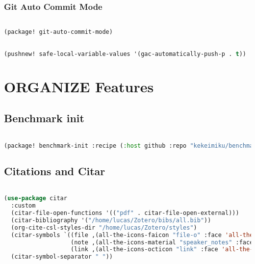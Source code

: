 \documentclass[11pt]{article}
\begin{document}
\subsubsection{Git Auto Commit Mode}
\label{sec:git-auto-commit-mode}
\begin{lstlisting}[language=Lisp]%! Someone please complete this list for me

(package! git-auto-commit-mode)
\end{lstlisting}

\begin{lstlisting}[language=Lisp]%! Someone please complete this list for me

(pushnew! safe-local-variable-values '(gac-automatically-push-p . t))
\end{lstlisting}



\section{ORGANIZE Features}
\label{sec:organize-features}


\subsection{Benchmark init}
\label{sec:benchmark-init}
\begin{lstlisting}[language=Lisp]%! Someone please complete this list for me

(package! benchmark-init :recipe (:host github :repo "kekeimiku/benchmark-init-el"))
\end{lstlisting}

\subsection{Citations and Citar}
\label{sec:citations-and-citar}
\begin{lstlisting}[language=Lisp]%! Someone please complete this list for me

(use-package citar
  :custom
  (citar-file-open-functions '(("pdf" . citar-file-open-external)))
  (citar-bibliography '("/home/lucas/Zotero/bibs/all.bib"))
  (org-cite-csl-styles-dir "/home/lucas/Zotero/styles")
  (citar-symbols `((file ,(all-the-icons-faicon "file-o" :face 'all-the-icons-green :v-adjust -0.1) . " ")
                   (note ,(all-the-icons-material "speaker_notes" :face 'all-the-icons-blue :v-adjust -0.3) . " ")
                   (link ,(all-the-icons-octicon "link" :face 'all-the-icons-orange :v-adjust 0.01) . " ")))
  (citar-symbol-separator " "))
\end{lstlisting}
\end{document}
